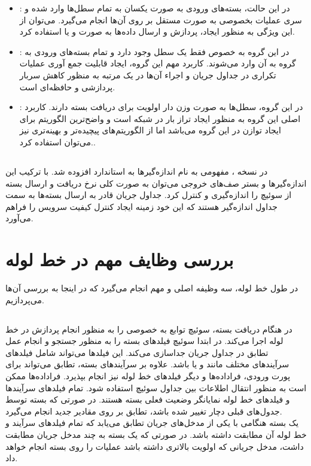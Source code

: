 \begin{itemize}
	\item {}:
در این حالت، بسته‌های ورودی به صورت یکسان به تمام سطل‌ها وارد شده و سری عملیات بخصوصی به صورت مستقل بر روی آن‌ها انجام می‌گیرد. می‌توان از این ویژگی به منظور ایجاد، پردازش و ارسال داده‌ها به صورت  و یا  استفاده کرد.
	\item {}:
در این گروه به خصوص فقط یک سطل وجود دارد و تمام بسته‌های ورودی به گروه به آن وارد می‌شوند. کاربرد مهم این گروه، ایجاد قابلیت جمع آوری عملیات تکراری در جداول جریان و اجراء آن‌ها در یک مرتبه به منظور کاهش سربار پردازشی و حافظه‌ای است.
	\item {}:
در این گروه، سطل‌ها به صورت وزن دار اولویت برای دریافت بسته دارند. کاربرد اصلی این گروه به منظور ایجاد تراز بار در شبکه است و واضح‌ترین الگوریتم برای ایجاد توازن در این گروه  می‌باشد اما از الگوریتم‌های پیچیده‌تر و بهینه‌تری نیز می‌توان استفاده کرد..
\end{itemize}

\subsection{}
در نسخه ، مفهومی به نام اندازه‌گیر‌ها به استاندارد  افزوده شد. با ترکیب این اندازه‌گیر‌ها و بستر صف‌های خروجی می‌توان به صورت کلی نرخ دریافت و ارسال بسته از سوئیچ را اندازه‌گیری و کنترل کرد. جداول جریان قادر به ارسال بسته‌ها به سمت جداول اندازه‌گیر هستند که این خود زمینه ایجاد کنترل کیفیت سرویس را فراهم می‌آورد.

\section{بررسی وظایف مهم در خط لوله}
در طول خط لوله، سه وظیفه اصلی و مهم انجام می‌گیرد که در اینجا به بررسی آن‌ها می‌پردازیم.

\subsection{}
در هنگام دریافت بسته، سوئیچ توابع به خصوصی را به منظور انجام پردازش در خط لوله اجرا می‌کند. در ابتدا سوئیچ فیلد‌های بسته را به منظور جستجو و انجام عمل تطابق در جداول جریان جداسازی می‌کند. این فیلد‌ها می‌تواند شامل فیلد‌های سرآیند‌های مختلف مانند  و یا  باشد. علاوه بر سرآیند‌های بسته، تطابق می‌تواند برای پورت ورودی، فراداده‌ها و دیگر فیلد‌های خط لوله نیز انجام بپذیرد. فراداده‌ها ممکن است به منظور انتقال اطلاعات بین جداول سوئیچ استفاده شود. تمام فیلد‌های سرآیند‌ها و فیلد‌های خط لوله نمایانگر وضعیت فعلی بسته هستند. در صورتی که بسته توسط جدول‌های قبلی دچار تغییر شده باشد، تطابق بر روی مقادیر جدید انجام می‌گیرد.\\
یک بسته هنگامی با یکی از مدخل‌های جریان تطابق می‌یابد که تمام فیلد‌های سرآیند و خط لوله آن مطابقت داشته باشد. در صورتی که یک بسته به چند مدخل جریان مطابقت داشت، مدخل جریانی که اولویت بالاتری داشته باشد عملیات را روی بسته انجام خواهد داد.

